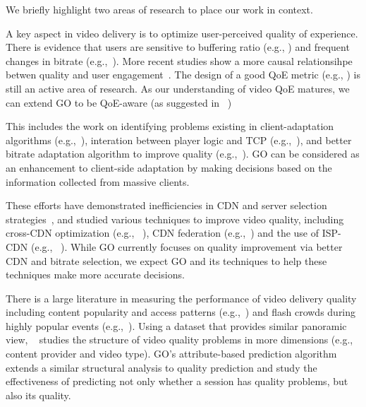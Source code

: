 We briefly highlight two areas of research to place our work in context.

A key aspect in  video delivery is to optimize user-perceived  quality of experience.  There is evidence that
users are sensitive to buffering ratio (e.g., \cite{sigcomm11}) and frequent changes in bitrate (e.g.,~\cite{user-adaptive,videoqoe}). More recent studies show a more causal relationsihpe betwen quality and user engagement~\cite{akamai-imc12}. The design of a good QoE metric (e.g., \cite{qscore}) is still an active area of research. As our understanding of video QoE matures, we can extend GO to be QoE-aware (as suggested in ~\cite{sekar2012quest})

 This includes the work on identifying problems existing in client-adaptation algorithms (e.g.,~\cite{mmsys2011cisco}), interation between player logic and TCP (e.g.,~\cite{usenix12_ghobadi,nossdav12_esteban}), and better bitrate adaptation algorithm to improve quality (e.g.,~\cite{nossdav12_akhshabi,festive}). GO can be considered as an enhancement to client-side adaptation by making decisions based on the information collected from massive clients.

 These efforts have demonstrated inefficiencies in CDN and server selection strategies~\cite{youtubecdn,youtube-infra}, and studied various techniques to improve video quality, including cross-CDN optimization (e.g., ~\cite{sigcomm12,sigcomm12cdnmulti}), CDN federation (e.g.,~\cite{peterson2013framework}) and the use of ISP-CDN (e.g., ~\cite{yu2012tradeoffs,frank2013pushing}).  While GO currently focuses on quality improvement via better CDN and bitrate selection, we expect GO and its techniques to help these techniques make more accurate decisions.

  There is a large  literature in measuring the performance of video delivery quality including content popularity and access patterns (e.g.,~\cite{youtube-imc07}\cite{plissonneau2012longitudinal}) and flash crowds during highly popular events (e.g.,~\cite{beijing-imc09}). Using a dataset that provides similar panoramic view, ~\cite{jiang2013shedding} studies the structure of video quality problems in more dimensions (e.g., content provider and video type). GO's attribute-based prediction algorithm extends a similar structural analysis to quality prediction and study the effectiveness of predicting not only whether a session has quality problems, but also its quality.

